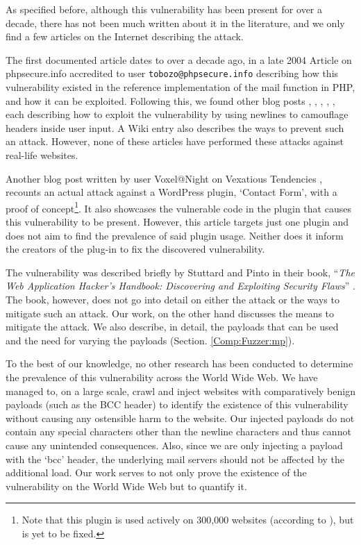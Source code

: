 As specified before, although this vulnerability has been present for over a decade, there has not been much written about it in the literature, and we only find a few articles on the Internet describing the attack.

The first documented article dates to over a decade ago, in a late 2004 Article on phpsecure.info \cite{Tobozo} accredited to user \lstinline|tobozo@phpsecure.info| describing how this vulnerability existed in the reference implementation of the mail function in PHP, and how it can be exploited. Following this, we found other blog posts \cite{Calin}, \cite{DK}, \cite{Injection2}, \cite{Nicol}, \cite{Pope}, each describing how to exploit the vulnerability by using newlines to camouflage headers inside user input. A Wiki entry \cite{Injection} also describes the ways to prevent such an attack. However, none of these articles have performed these attacks against real-life websites.

Another blog post written by user Voxel@Night on Vexatious Tendencies \cite{Tendencies2014}, recounts an actual attack against a WordPress plugin, `Contact Form', with a proof of concept\footnote{Note that this plugin is used actively on 300,000 websites (according to \cite{BestWebSoft2016}), but is yet to be fixed.}. It also showcases the vulnerable code in the plugin that causes this vulnerability to be present. However, this article targets just one plugin and does not aim to find the prevalence of said plugin usage. Neither does it inform the creators of the plug-in to fix the discovered vulnerability.

The vulnerability was described briefly by Stuttard and Pinto in their book, ``\emph{The Web Application Hacker's Handbook: Discovering and Exploiting Security Flaws}'' \cite{stuttard2011web}. The book, however, does not go into detail on either the attack or the ways to mitigate such an attack. Our work, on the other hand discusses the means to mitigate the attack. We also describe, in detail, the payloads that can be used and the need for varying the payloads (Section. \ref{Comp:Fuzzer:mp}).

To the best of our knowledge, no other research has been conducted to determine the prevalence of this vulnerability across the World Wide Web. We have managed to, on a large scale, crawl and inject websites with comparatively benign payloads (such as the BCC header) to identify the existence of this vulnerability without causing any ostensible harm to the website. Our injected payloads do not contain any special characters other than the newline characters and thus cannot cause any unintended consequences. Also, since we are only injecting a payload with the `bcc' header, the underlying mail servers should not be affected by the additional load. Our work serves to not only prove the existence of the vulnerability on the World Wide Web but to quantify it.

